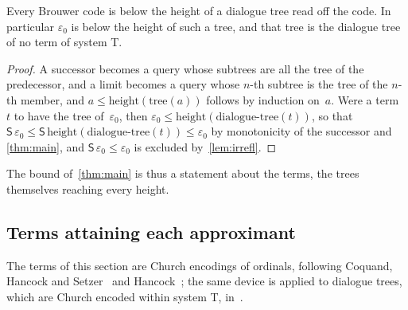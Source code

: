 \documentclass[11pt]{amsart}
\makeatletter
\newcommand{\dtree}{\mathrm{dialogue\text{-}tree}}
\newcommand{\height}{\mathrm{height}}
\newcommand{\bS}{\mathsf{S}}
\newcommand{\eps}{\varepsilon_{0}}
\newif\ifagdarefs
\newcommand{\AgdaRefs}[1]{\ifagdarefs{\footnotesize\color{agdablue}(#1)}\else\unskip\fi}
\newcommand{\Agda}[2]{{\footnotesize\color{agdablue}\textsf{#1}%
  \ifblank{#2}{}{\texttt{.}\allowbreak\texttt{#2}}}}
\let\ttt@plain\texttt
\renewcommand{\texttt}[1]{{\footnotesize\color{agdablue}\ttt@plain{#1}}}
\theoremstyle{plain}
\theoremstyle{definition}
\makeatother
\begin{document}
\begin{proposition}
\label{prop:tree-of}
Every Brouwer code is below the height of a dialogue tree read off the
code. In particular $\eps$ is below the height of such a tree, and
that tree is the dialogue tree of no term of system T.
\AgdaRefs{\Agda{DialogueTrees.Examples}{tree-of};
\texttt{code-≤-height}, \texttt{approximant}, \texttt{epsilon₀},
\texttt{no-term-of-height-ε₀}.}
\end{proposition}

\begin{proof}
A successor becomes a query whose subtrees are all the tree of the
predecessor, and a limit becomes a query whose $n$-th subtree is the
tree of the $n$-th member, and $a \le \height(\mathrm{tree}(a))$
follows by induction on~$a$. Were a term~$t$ to have the tree of~$\eps$,
then $\eps \le \height(\dtree(t))$, so that
$\bS\,\eps \le \bS\,\height(\dtree(t)) \le \eps$ by monotonicity of
the successor and \cref{thm:main}, and $\bS\,\eps \le \eps$ is
excluded by~\cref{lem:irrefl}.
\AgdaRefs{\Agda{DialogueTrees.Examples}{S-irrefl}.}
\end{proof}

The bound of~\cref{thm:main} is thus a statement about the terms, the
trees themselves reaching every height.

\subsection{Terms attaining each approximant}
\label{sec:church}

The terms of this section are Church encodings of ordinals, following
Coquand, Hancock and Setzer~\cite{CoquandHancockSetzer1997} and
Hancock~\cite{Hancock2008}; the same
device is applied to dialogue trees, which are Church encoded within
system T, in~\cite{EscardoPaivaRahliTosun2025}.
\end{document}

